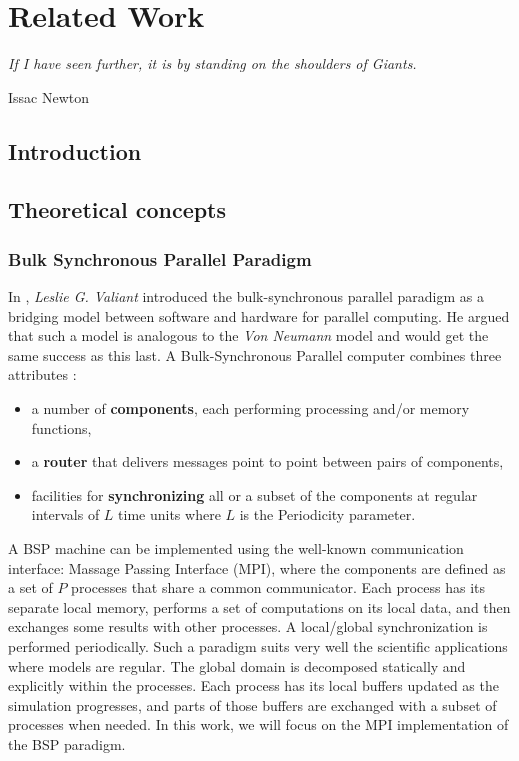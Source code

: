 \chapter{Related Work}

\epigraph{\textit{If I have seen further, it is by standing on the shoulders of Giants.}} {Issac Newton}

\newpage
\section{Introduction}
\section{Theoretical concepts}\label{Theoretical}

\subsection{Bulk Synchronous Parallel Paradigm}\label{BSP}
In \cite{valiant1990bsp}, \textit{Leslie G. Valiant} introduced the bulk-synchronous parallel paradigm as a bridging model between software and hardware for parallel computing. He argued that such a model is analogous to the \textit{Von Neumann} model and would get the same success as this last.
A Bulk-Synchronous Parallel computer combines three attributes : 
\begin{itemize}
    \item a number of \textbf{components}, each performing processing and/or memory functions,
    \item a \textbf{router} that delivers messages point to point between pairs of components,
    \item facilities for \textbf{synchronizing} all or a subset of the components at regular intervals of $L$ time units where $L$ is the Periodicity parameter.
\end{itemize}

A BSP machine can be implemented using the well-known communication interface: Massage Passing Interface (MPI), where the components are defined as a set of $P$ processes that share a common communicator. Each process has its separate local memory, performs a set of computations on its local data, and then exchanges some results with other processes. A local/global synchronization is performed periodically. Such a paradigm suits very well the scientific applications where models are regular. The global domain is decomposed statically and explicitly within the processes. Each process has its local buffers updated as the simulation progresses, and parts of those buffers are exchanged with a subset of processes when needed. In this work, we will focus on the MPI implementation of the BSP paradigm.

